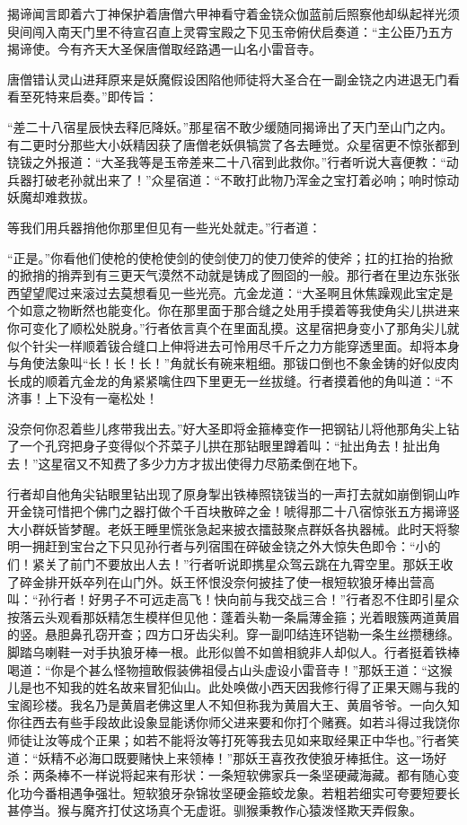 \documentclass[12pt,UTF8]{ctexbook}
\begin{document}
揭谛闻言即着六丁神保护着唐僧六甲神看守着金铙众伽蓝前后照察他却纵起祥光须臾间闯入南天门里不待宣召直上灵霄宝殿之下见玉帝俯伏启奏道：“主公臣乃五方揭谛使。今有齐天大圣保唐僧取经路遇一山名小雷音寺。

唐僧错认灵山进拜原来是妖魔假设困陷他师徒将大圣合在一副金铙之内进退无门看看至死特来启奏。”即传旨：

“差二十八宿星辰快去释厄降妖。”那星宿不敢少缓随同揭谛出了天门至山门之内。有二更时分那些大小妖精因获了唐僧老妖俱犒赏了各去睡觉。众星宿更不惊张都到铙钹之外报道：“大圣我等是玉帝差来二十八宿到此救你。”行者听说大喜便教：“动兵器打破老孙就出来了！”众星宿道：“不敢打此物乃浑金之宝打着必响；响时惊动妖魔却难救拔。

等我们用兵器捎他你那里但见有一些光处就走。”行者道：

“正是。”你看他们使枪的使枪使剑的使剑使刀的使刀使斧的使斧；扛的扛抬的抬掀的掀捎的捎弄到有三更天气漠然不动就是铸成了囫囵的一般。那行者在里边东张张西望望爬过来滚过去莫想看见一些光亮。亢金龙道：“大圣啊且休焦躁观此宝定是个如意之物断然也能变化。你在那里面于那合缝之处用手摸着等我使角尖儿拱进来你可变化了顺松处脱身。”行者依言真个在里面乱摸。这星宿把身变小了那角尖儿就似个针尖一样顺着钹合缝口上伸将进去可怜用尽千斤之力方能穿透里面。却将本身与角使法象叫“长！长！长！”角就长有碗来粗细。那钹口倒也不象金铸的好似皮肉长成的顺着亢金龙的角紧紧噙住四下里更无一丝拔缝。行者摸着他的角叫道：“不济事！上下没有一毫松处！

没奈何你忍着些儿疼带我出去。”好大圣即将金箍棒变作一把钢钻儿将他那角尖上钻了一个孔窍把身子变得似个芥菜子儿拱在那钻眼里蹲着叫：“扯出角去！扯出角去！”这星宿又不知费了多少力方才拔出使得力尽筋柔倒在地下。

行者却自他角尖钻眼里钻出现了原身掣出铁棒照铙钹当的一声打去就如崩倒铜山咋开金铙可惜把个佛门之器打做个千百块散碎之金！唬得那二十八宿惊张五方揭谛竖大小群妖皆梦醒。老妖王睡里慌张急起来披衣擂鼓聚点群妖各执器械。此时天将黎明一拥赶到宝台之下只见孙行者与列宿围在碎破金铙之外大惊失色即令：“小的们！紧关了前门不要放出人去！”行者听说即携星众驾云跳在九霄空里。那妖王收了碎金排开妖卒列在山门外。妖王怀恨没奈何披挂了使一根短软狼牙棒出营高叫：“孙行者！好男子不可远走高飞！快向前与我交战三合！”行者忍不住即引星众按落云头观看那妖精怎生模样但见他：蓬着头勒一条扁薄金箍；光着眼簇两道黄眉的竖。悬胆鼻孔窃开查；四方口牙齿尖利。穿一副叩结连环铠勒一条生丝攒穗绦。脚踏乌喇鞋一对手执狼牙棒一根。此形似兽不如兽相貌非人却似人。行者挺着铁棒喝道：“你是个甚么怪物擅敢假装佛祖侵占山头虚设小雷音寺！”那妖王道：“这猴儿是也不知我的姓名故来冒犯仙山。此处唤做小西天因我修行得了正果天赐与我的宝阁珍楼。我名乃是黄眉老佛这里人不知但称我为黄眉大王、黄眉爷爷。一向久知你往西去有些手段故此设象显能诱你师父进来要和你打个赌赛。如若斗得过我饶你师徒让汝等成个正果；如若不能将汝等打死等我去见如来取经果正中华也。”行者笑道：“妖精不必海口既要赌快上来领棒！”那妖王喜孜孜使狼牙棒抵住。这一场好杀：两条棒不一样说将起来有形状：一条短软佛家兵一条坚硬藏海藏。都有随心变化功今番相遇争强壮。短软狼牙杂锦妆坚硬金箍蛟龙象。若粗若细实可夸要短要长甚停当。猴与魔齐打仗这场真个无虚诳。驯猴秉教作心猿泼怪欺天弄假象。
\end{document}
